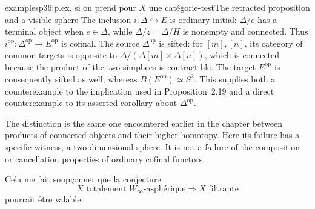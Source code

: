 \begin{dcomment}{examples}{p36:p.ex. si on prend pour $X$ une catégorie-test}{The retracted proposition and a visible sphere}
The inclusion $i:\Delta\hookrightarrow E$ is ordinary initial: $\Delta/e$ has a terminal object when $e\in\Delta$, while $\Delta/z=\Delta/H$ is nonempty and connected. Thus $i^{\mathrm{op}}:\Delta^{\mathrm{op}}\longrightarrow E^{\mathrm{op}}$ is cofinal. The source $\Delta^{\mathrm{op}}$ is sifted: for $[m],[n]$, its category of common targets is opposite to $\Delta/(\Delta[m]\times\Delta[n])$, which is connected because the product of the two simplices is contractible. The target $E^{\mathrm{op}}$ is consequently sifted as well, whereas $B(E^{\mathrm{op}})\simeq S^2$. This supplies both a counterexample to the implication used in Proposition~2.19 and a direct counterexample to its asserted corollary about $\Delta^{\mathrm{op}}$.

The distinction is the same one encountered earlier in the chapter between products of connected objects and their higher homotopy. Here its failure has a specific witness, a two-dimensional sphere. It is not a failure of the composition or cancellation properties of ordinary cofinal functors.
\end{dcomment}


Cela me fait soupçonner que la conjecture
\[
X \text{ totalement } W_\infty\text{-asphérique} \Longrightarrow X \text{ filtrante}
\]
pourrait être valable.

